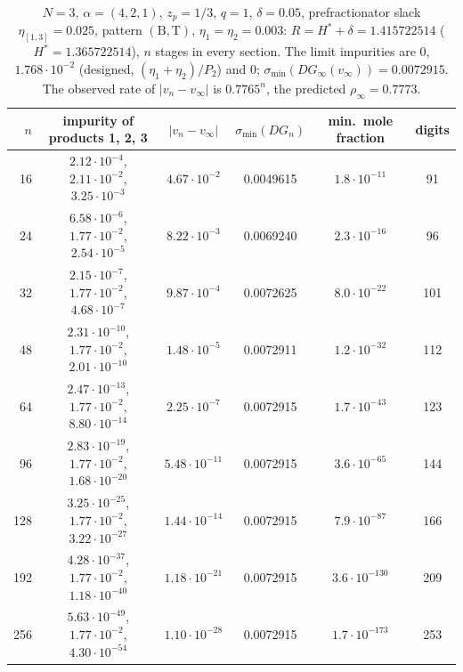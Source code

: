 \documentclass[11pt,a4paper]{report}
\newcommand{\Hs}{H^{*}}
\newcommand{\Ts}{\mathrm T}
\newcommand{\Bs}{\mathrm B}
\begin{document}
\begin{table}[t]
\centering\footnotesize\setlength{\tabcolsep}{4pt}
\caption{\(N=3\), \(\alpha=(4,2,1)\), \(z_p=1/3\), \(q=1\), \(\delta=0.05\), prefractionator slack \(\eta_{[1,3]}=0.025\), pattern
\((\Bs,\Ts)\), \(\eta_1=\eta_2=0.003\): \(R=\Hs+\delta=1.415722514\) (\(\Hs=1.365722514\)), \(n\) stages in every section. The limit
impurities are \(0\), \(1.768\cdot10^{-2}\) (designed, \((\eta_1+\eta_2)/P_2\)) and \(0\); \(\sigma_{\min}(DG_\infty(v_\infty))=0.0072915\).
The observed rate of \(|v_n-v_\infty|\) is \(0.7765^n\), the predicted \(\rho_\infty=0.7773\).}\label{tab:n3}
\begin{tabular}{@{}rccccc@{}}
\toprule
\(n\) & impurity of products 1, 2, 3 & \(|v_n-v_\infty|\) & \(\sigma_{\min}(DG_n)\) & min.\ mole fraction & digits\\
\midrule
16 & \(2.12\cdot10^{-4}\), \(2.11\cdot10^{-2}\), \(3.25\cdot10^{-3}\) & \(4.67\cdot10^{-2}\) & 0.0049615 & \(1.8\cdot10^{-11}\) & 91\\
24 & \(6.58\cdot10^{-6}\), \(1.77\cdot10^{-2}\), \(2.54\cdot10^{-5}\) & \(8.22\cdot10^{-3}\) & 0.0069240 & \(2.3\cdot10^{-16}\) & 96\\
32 & \(2.15\cdot10^{-7}\), \(1.77\cdot10^{-2}\), \(4.68\cdot10^{-7}\) & \(9.87\cdot10^{-4}\) & 0.0072625 & \(8.0\cdot10^{-22}\) & 101\\
48 & \(2.31\cdot10^{-10}\), \(1.77\cdot10^{-2}\), \(2.01\cdot10^{-10}\) & \(1.48\cdot10^{-5}\) & 0.0072911 & \(1.2\cdot10^{-32}\) & 112\\
64 & \(2.47\cdot10^{-13}\), \(1.77\cdot10^{-2}\), \(8.80\cdot10^{-14}\) & \(2.25\cdot10^{-7}\) & 0.0072915 & \(1.7\cdot10^{-43}\) & 123\\
96 & \(2.83\cdot10^{-19}\), \(1.77\cdot10^{-2}\), \(1.68\cdot10^{-20}\) & \(5.48\cdot10^{-11}\) & 0.0072915 & \(3.6\cdot10^{-65}\) & 144\\
128 & \(3.25\cdot10^{-25}\), \(1.77\cdot10^{-2}\), \(3.22\cdot10^{-27}\) & \(1.44\cdot10^{-14}\) & 0.0072915 & \(7.9\cdot10^{-87}\) & 166\\
192 & \(4.28\cdot10^{-37}\), \(1.77\cdot10^{-2}\), \(1.18\cdot10^{-40}\) & \(1.18\cdot10^{-21}\) & 0.0072915 & \(3.6\cdot10^{-130}\) & 209\\
256 & \(5.63\cdot10^{-49}\), \(1.77\cdot10^{-2}\), \(4.30\cdot10^{-54}\) & \(1.10\cdot10^{-28}\) & 0.0072915 & \(1.7\cdot10^{-173}\) & 253\\
\bottomrule
\end{tabular}
\end{table}
\end{document}
